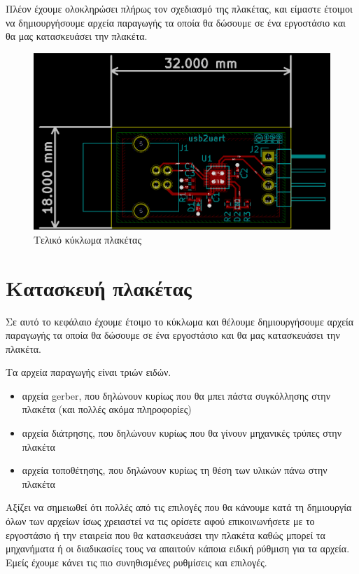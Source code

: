 \documentclass[a4paper]{article}
\begin{document}
Πλέον έχουμε ολοκληρώσει πλήρως τον σχεδιασμό της πλακέτας, και είμαστε έτοιμοι να δημιουργήσουμε αρχεία παραγωγής τα οποία θα δώσουμε σε ένα εργοστάσιο και θα μας κατασκευάσει την πλακέτα.

\begin{figure}
  \begin{center}
    \includegraphics[width=.9\textwidth]{img/pcb-circ-finaldrwn.png}
    \caption{Τελικό κύκλωμα πλακέτας}
    \label{fig:pcb-circ-finaldrwn}
  \end{center}
\end{figure}


\newpage
\section{Κατασκευή πλακέτας}
Σε αυτό το κεφάλαιο έχουμε έτοιμο το κύκλωμα και θέλουμε δημιουργήσουμε αρχεία παραγωγής τα οποία θα δώσουμε σε ένα εργοστάσιο και θα μας κατασκευάσει την πλακέτα. 

Τα αρχεία παραγωγής είναι τριών ειδών.

\begin{itemize}
    \item αρχεία gerber, που δηλώνουν κυρίως που θα μπει πάστα συγκόλλησης στην πλακέτα (και πολλές ακόμα πληροφορίες)
    \item αρχεία διάτρησης, που δηλώνουν κυρίως που θα γίνουν μηχανικές τρύπες στην πλακέτα
    \item αρχεία τοποθέτησης, που δηλώνουν κυρίως τη θέση των υλικών πάνω στην πλακέτα
\end{itemize}

Αξίζει να σημειωθεί ότι πολλές από τις επιλογές που θα κάνουμε κατά τη δημιουργία όλων των αρχείων ίσως χρειαστεί να τις ορίσετε αφού επικοινωνήσετε με το εργοστάσιο ή την εταιρεία που θα κατασκευάσει την πλακέτα καθώς μπορεί τα μηχανήματα ή οι διαδικασίες τους να απαιτούν κάποια ειδική ρύθμιση για τα αρχεία. Εμείς έχουμε κάνει τις πιο συνηθισμένες ρυθμίσεις και επιλογές.
\end{document}
